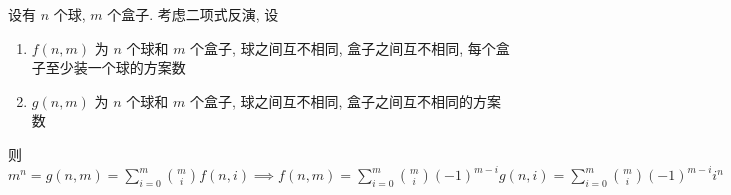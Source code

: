 设有 \(n\) 个球, \(m\) 个盒子. 考虑二项式反演, 设

\begin{enumerate}
    \item \(f(n,m)\) 为 \(n\) 个球和 \(m\) 个盒子, 球之间互不相同, 盒子之间互不相同, 每个盒子至少装一个球的方案数
    \item \(g(n,m)\) 为 \(n\) 个球和 \(m\) 个盒子, 球之间互不相同, 盒子之间互不相同的方案数
\end{enumerate}

则 \(\displaystyle m^n=g(n,m)=\sum_{i=0}^m\binom{m}{i}f(n,i) \implies f(n,m)=\sum_{i=0}^m\binom{m}{i}(-1)^{m-i}g(n,i)=\sum_{i=0}^m\binom{m}{i}(-1)^{m-i}i^n\)
